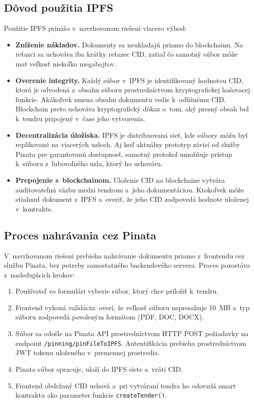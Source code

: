 \subsection{Dôvod použitia IPFS}
\label{subsec:ipfs_rationale}

Použitie IPFS prináša v~navrhovanom riešení viacero výhod:
\begin{itemize}
    \item \textbf{Zníženie nákladov.} Dokumenty sa neukladajú priamo do
    blockchainu. Na reťazci sa uchováva iba krátky reťazec CID, zatiaľ
    čo samotný súbor môže mať veľkosť niekoľko megabajtov.

    \item \textbf{Overenie integrity.} Každý súbor v~IPFS je
    identifikovaný hodnotou CID, ktorá je odvodená z~obsahu súboru
    prostredníctvom kryptografickej hašovacej funkcie. Akákoľvek zmena
    obsahu dokumentu vedie k~odlišnému CID. Blockchain preto uchováva
    kryptografický dôkaz o~tom, aký presný obsah bol k~tendru pripojený
    v~čase jeho vytvorenia.

    \item \textbf{Decentralizácia úložiska.} IPFS je distribuovaná
    sieť, kde súbory môžu byť replikované na viacerých uzloch. Aj keď
    aktuálny prototyp závisí od služby Pinata pre garantovanú
    dostupnosť, samotný protokol umožňuje prístup k~súboru z~ľubovoľného
    uzla, ktorý ho uchováva.

    \item \textbf{Prepojenie s~blockchainom.} Uloženie CID na blockchaine
    vytvára auditovateľnú väzbu medzi tendrom a~jeho dokumentáciou.
    Ktokoľvek môže stiahnuť dokument z~IPFS a~overiť, že jeho CID
    zodpovedá hodnote uloženej v~kontrakte.
\end{itemize}

\subsection{Proces nahrávania cez Pinata}
\label{subsec:pinata_upload}

V~navrhovanom riešení prebieha nahrávanie dokumentu priamo z~frontendu
cez službu Pinata, bez potreby samostatného backendového servera.
Proces pozostáva z~nasledujúcich krokov:
\begin{enumerate}
    \item Používateľ vo formulári vyberie súbor, ktorý chce priložiť
    k~tendru.
    \item Frontend vykoná validáciu: overí, že veľkosť súboru nepresahuje
    10~MB a~typ súboru zodpovedá povoleným formátom (PDF, DOC, DOCX).
    \item Súbor sa odošle na Pinata API prostredníctvom HTTP POST
    požiadavky na endpoint \texttt{/pinning/pinFileToIPFS}. Autentifikácia
    prebieha prostredníctvom JWT tokenu uloženého v~premennej prostredia.
    \item Pinata súbor spracuje, uloží do IPFS siete a~vráti CID.
    \item Frontend obdržaný CID uchová a~pri vytváraní tendra ho odovzdá
    smart kontraktu ako parameter funkcie \texttt{createTender()}.
\end{enumerate}

